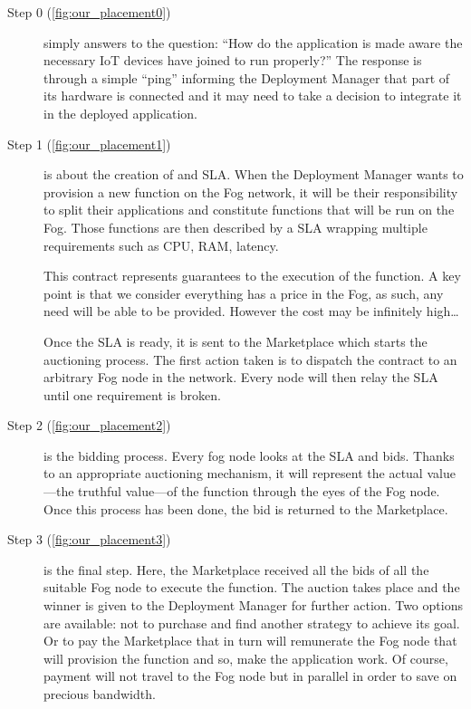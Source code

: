 \documentclass[11pt]{sdm}
\begin{document}
\begin{description}
	\item[Step 0 (\cref{fig:our_placement0})]{simply answers to the question: “How do the application is made aware the necessary \gls{IoT} devices have joined to run properly?” 
		The response is through a simple “ping” informing the Deployment Manager that part of its hardware is connected and it may need to take a decision to integrate it in the deployed application.
	}
	\item[Step 1 (\cref{fig:our_placement1})] {is about the creation of and \gls{SLA}. When the Deployment Manager wants to provision a new function on the Fog network, it will be their responsibility to split their applications and constitute functions that will be run on the Fog. Those functions are then described by a \gls{SLA} wrapping multiple requirements such as CPU, RAM, latency.
		
		This contract represents guarantees to the execution of the function. A key point is that we consider everything has a price in the Fog, as such, any need will be able to be provided. However the cost may be infinitely high…
		
		Once the \gls{SLA} is ready, it is sent to the Marketplace which starts the auctioning process. The first action taken is to dispatch the contract to an arbitrary Fog node in the network. Every node will then relay the \gls{SLA} until one requirement is broken.
	}
	\item[Step 2 (\cref{fig:our_placement2})] {is the bidding process. Every fog node looks at the \gls{SLA} and bids. Thanks to an appropriate  auctioning mechanism, it will represent the actual value—the truthful value—of the function through the eyes of the Fog node. Once this process has been done, the bid is returned to the Marketplace.}
	\item[Step 3 (\cref{fig:our_placement3})] {is the final step. Here, the Marketplace received all the bids of all the suitable Fog node to execute the function. The auction takes place and the winner is given to the Deployment Manager for further action. Two options are available: not to purchase and find another strategy to achieve its goal. Or to pay the Marketplace that in turn will remunerate the Fog node that will provision the function and so, make the application work. Of course, payment will not travel to the Fog node but in parallel in order to save on precious bandwidth.}
\end{description}
\end{document}
